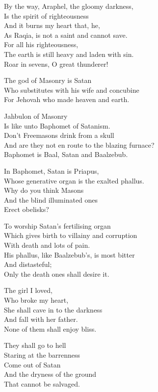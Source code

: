 \documentclass[
]{book}
\begin{document}
By the way, Araphel, the gloomy darkness,\\
Is the spirit of righteousness\\
And it burns my heart that, he,\\
As Raqia, is not a saint and cannot save.\\
For all his righteousness,\\
The earth is still heavy and laden with sin.\\
Roar in sevens, O great thunderer!

The god of Masonry is Satan\\
Who substitutes with his wife and concubine\\
For Jehovah who made heaven and earth.

Jahbulon of Masonry\\
Is like unto Baphomet of Satanism.\\
Don't Freemasons drink from a skull\\
And are they not en route to the blazing furnace?\\
Baphomet is Baal, Satan and Baalzebub.

In Baphomet, Satan is Priapus,\\
Whose generative organ is the exalted phallus.\\
Why do you think Masons\\
And the blind illuminated ones\\
Erect obelisks?

To worship Satan's fertilising organ\\
Which gives birth to villainy and corruption\\
With death and lots of pain.\\
His phallus, like Baalzebub's, is most bitter\\
And distasteful;\\
Only the death ones shall desire it.

The girl I loved,\\
Who broke my heart,\\
She shall cave in to the darkness\\
And fall with her father.\\
None of them shall enjoy bliss.

They shall go to hell\\
Staring at the barrenness\\
Come out of Satan\\
And the dryness of the ground\\
That cannot be salvaged.
\end{document}
